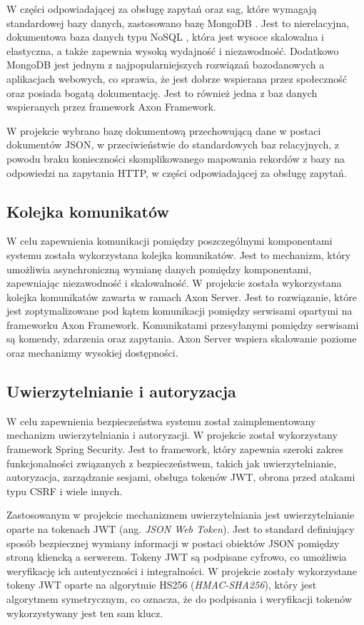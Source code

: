 W części odpowiadającej za obsługę zapytań oraz sag, które wymagają standardowej bazy danych, zastosowano bazę MongoDB \cite{mongodb}. Jest to nierelacyjna, dokumentowa baza danych typu NoSQL \cite{nosql},  która jest wysoce skalowalna i elastyczna, a także zapewnia wysoką wydajność i niezawodność. Dodatkowo MongoDB jest jednym z najpopularniejszych rozwiązań bazodanowych a aplikacjach webowych, co sprawia, że jest dobrze wspierana przez społeczność oraz posiada bogatą dokumentację. Jest to również jedna z baz danych wspieranych przez framework Axon Framework.

W projekcie wybrano bazę dokumentową przechowującą dane w postaci dokumentów JSON, w przeciwieństwie do standardowych baz relacyjnych, z powodu braku konieczności skomplikowanego mapowania rekordów z bazy na odpowiedzi na zapytania HTTP, w części odpowiadającej za obsługę zapytań.

\subsection{Kolejka komunikatów}

W celu zapewnienia komunikacji pomiędzy poszczególnymi komponentami systemu została wykorzystana kolejka komunikatów. Jest to mechanizm, który umożliwia asynchroniczną wymianę danych pomiędzy komponentami, zapewniając niezawodność i skalowalność. W projekcie została wykorzystana kolejka komunikatów zawarta w ramach Axon Server. Jest to rozwiązanie, które jest zoptymalizowane pod kątem komunikacji pomiędzy serwisami opartymi na frameworku Axon Framework. Komunikatami przesyłanymi pomiędzy serwisami są komendy, zdarzenia oraz zapytania. Axon Server wspiera skalowanie poziome oraz mechanizmy wysokiej dostępności.

\subsection{Uwierzytelnianie i autoryzacja}

W celu zapewnienia bezpieczeństwa systemu został zaimplementowany mechanizm uwierzytelniania i autoryzacji. W projekcie został wykorzystany framework Spring Security. Jest to framework, który zapewnia szeroki zakres funkcjonalności związanych z bezpieczeństwem, takich jak uwierzytelnianie, autoryzacja, zarządzanie sesjami, obsługa tokenów JWT, obrona przed atakami typu CSRF i wiele innych.

Zastosowanym w projekcie mechanizmem uwierzytelniania jest uwierzytelnianie oparte na tokenach JWT (ang. \textit{JSON Web Token}). Jest to standard definiujący sposób bezpiecznej wymiany informacji w postaci obiektów JSON pomiędzy stroną kliencką a serwerem. Tokeny JWT są podpisane cyfrowo, co umożliwia weryfikację ich autentyczności i integralności. W projekcie zostały wykorzystane tokeny JWT oparte na algorytmie HS256 (\textit{HMAC-SHA256}), który jest algorytmem symetrycznym, co oznacza, że do podpisania i weryfikacji tokenów wykorzystywany jest ten sam klucz. 

